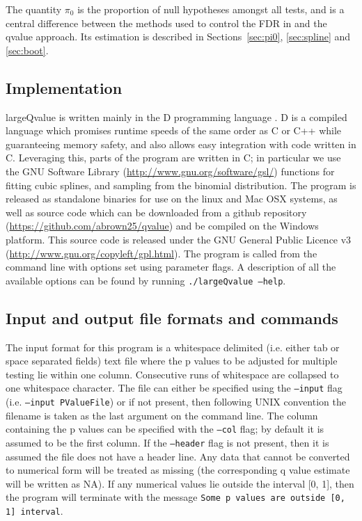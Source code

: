 \documentclass{amsart}
\begin{document}
The quantity $\pi_0$ is the proportion of null hypotheses amongst all tests, and is a central difference between the methods used to control the FDR in \citet{fdr} and the qvalue approach. Its estimation is described in Sections~\ref{sec:pi0}, \ref{sec:spline} and \ref{sec:boot}.

\subsection{Implementation}

largeQvalue is written mainly in the D programming language \citep{dlang}. D is a compiled language which promises runtime speeds of the same order as C or C++ while guaranteeing memory safety, and also allows easy integration with code written in C. Leveraging this, parts of the program are written in C; in particular we use the GNU Software Library (\url{http://www.gnu.org/software/gsl/}) functions for fitting cubic splines, and sampling from the binomial distribution. The program is released as standalone binaries for use on the linux and Mac OSX systems, as well as source code which can be downloaded from a github repository (\url{https://github.com/abrown25/qvalue}) and be compiled on the Windows platform. This source code is released under the GNU General Public Licence v3 (\url{http://www.gnu.org/copyleft/gpl.html}). The program is called from the command line with options set using parameter flags. A description of all the available options can be found by running \texttt{./largeQvalue --help}.

\subsection{Input and output file formats and commands}

The input format for this program is a whitespace delimited (i.e. either tab or space separated fields) text file where the p values to be adjusted for multiple testing lie within one column. Consecutive runs of whitespace are collapsed to one whitespace character. The file can either be specified using the \texttt{--input} flag (i.e. \texttt{--input PValueFile}) or if not present, then following UNIX convention the filename is taken as the last argument on the command line. The column containing the p values can be specified with the \texttt{--col} flag; by default it is assumed to be the first column. If the \texttt{--header} flag is not present, then it is assumed the file does not have a header line. Any data that cannot be converted to numerical form will be treated as missing (the corresponding q value estimate will be written as NA). If any numerical values lie outside the interval [0, 1], then the program will terminate with the message \texttt{Some p values are outside [0, 1] interval}.
\end{document}
